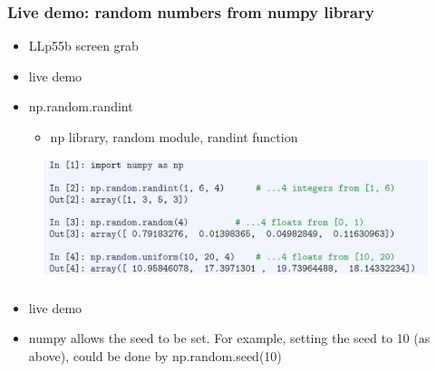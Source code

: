 \documentclass[14pt]{beamer}
\begin{document}
\begin{frame}[fragile]

\frametitle{Live demo: random numbers from numpy library}

\begin{itemize}
	\item LLp55b screen grab
	\item live demo
	\item np.random.randint
	\begin{itemize}
		\item np library, random module, randint function
	\end{itemize}
\end{itemize}

\begin{figure}[ht]
	\centering
	\includegraphics[width=\textwidth]{figures/LLp55b}
\end{figure}

\end{frame}


\begin{frame}[fragile]

\frametitle{}

\begin{itemize}
	\item live demo
	\item numpy allows the seed to be set. For example, setting the seed to 10 (as above), could be done by
np.random.seed(10)
\end{itemize}

\end{frame}

\end{document}
